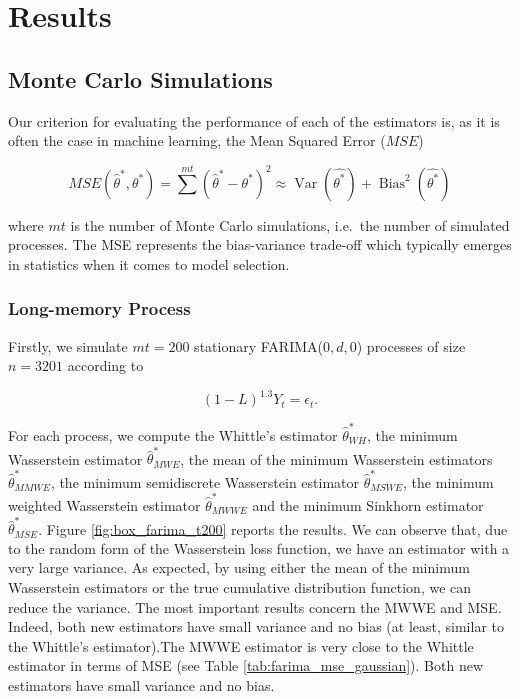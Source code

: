\documentclass[
  11pt,
]{article}
\begin{document}
\hypertarget{results}{%
\section{Results}\label{results}}

\hypertarget{monte-carlo-simulations}{%
\subsection{Monte Carlo Simulations}\label{monte-carlo-simulations}}

Our criterion for evaluating the performance of each of the estimators
is, as it is often the case in machine learning, the Mean Squared Error
(\(MSE\))

\[MSE(\hat \theta^*, \theta^*) = \sum^{mt}(\hat \theta^* - \theta^*)^2 \approx \operatorname{Var}(\hat{\theta^*})+\operatorname{Bias}^{2}(\hat{\theta^*})\]

where \(mt\) is the number of Monte Carlo simulations, i.e.~the number
of simulated processes. The MSE represents the bias-variance trade-off
which typically emerges in statistics when it comes to model selection.

\hypertarget{long-memory-process}{%
\subsubsection{Long-memory Process}\label{long-memory-process}}

Firstly, we simulate \(mt = 200\) stationary FARIMA(\(0,d,0\)) processes
of size \(n = 3201\) according to

\[(1-L)^{1.3}Y_t = \epsilon_t.\]

For each process, we compute the Whittle's estimator
\(\hat \theta^*_{WH}\), the minimum Wasserstein estimator
\(\hat \theta^*_{MWE}\), the mean of the minimum Wasserstein estimators
\(\hat \theta^*_{MMWE}\), the minimum semidiscrete Wasserstein estimator
\(\hat \theta^*_{MSWE}\), the minimum weighted Wasserstein estimator
\(\hat \theta^*_{MWWE}\) and the minimum Sinkhorn estimator
\(\hat \theta^*_{MSE}\). Figure \ref{fig:box_farima_t200} reports the
results. We can observe that, due to the random form of the Wasserstein
loss function, we have an estimator with a very large variance. As
expected, by using either the mean of the minimum Wasserstein estimators
or the true cumulative distribution function, we can reduce the
variance. The most important results concern the MWWE and MSE. Indeed,
both new estimators have small variance and no bias (at least, similar
to the Whittle's estimator).The MWWE estimator is very close to the
Whittle estimator in terms of MSE (see Table
\ref{tab:farima_mse_gaussian}). Both new estimators have small variance
and no bias.
\end{document}
